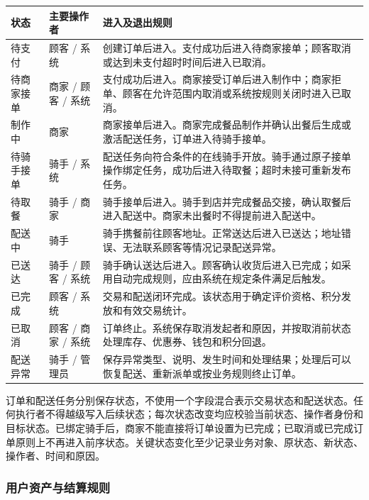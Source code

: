 \begin{longtable}{|>{\raggedright\arraybackslash}p{}|>{\raggedright\arraybackslash}p{}|>{\raggedright\arraybackslash}p{}|}
\hline
\textbf{状态} & \textbf{主要操作者} & \textbf{进入及退出规则} \\ \hline
待支付 & 顾客 / 系统 & 创建订单后进入。支付成功后进入待商家接单；顾客取消或达到未支付超时时间后进入已取消。 \\ \hline
待商家接单 & 商家 / 顾客 / 系统 & 支付成功后进入。商家接受订单后进入制作中；商家拒单、顾客在允许范围内取消或系统按规则关闭时进入已取消。 \\ \hline
制作中 & 商家 & 商家接单后进入。商家完成餐品制作并确认出餐后生成或激活配送任务，订单进入待骑手接单。 \\ \hline
待骑手接单 & 骑手 / 系统 & 配送任务向符合条件的在线骑手开放。骑手通过原子接单操作绑定任务，成功后进入待取餐；超时未接可重新发布任务。 \\ \hline
待取餐 & 骑手 / 商家 & 骑手接单后进入。骑手到店并完成餐品交接，确认取餐后进入配送中。商家未出餐时不得提前进入配送中。 \\ \hline
配送中 & 骑手 & 骑手携餐前往顾客地址。正常送达后进入已送达；地址错误、无法联系顾客等情况记录配送异常。 \\ \hline
已送达 & 骑手 / 顾客 / 系统 & 骑手确认送达后进入。顾客确认收货后进入已完成；如采用自动完成规则，应由系统在规定条件满足后触发。 \\ \hline
已完成 & 顾客 / 系统 & 交易和配送闭环完成。该状态用于确定评价资格、积分发放和有效交易统计。 \\ \hline
已取消 & 顾客 / 商家 / 系统 & 订单终止。系统保存取消发起者和原因，并按取消前状态处理库存、优惠券、钱包和积分回退。 \\ \hline
配送异常 & 骑手 / 管理员 & 保存异常类型、说明、发生时间和处理结果；处理后可以恢复配送、重新派单或按业务规则终止订单。 \\ \hline
\end{longtable}

订单和配送任务分别保存状态，不使用一个字段混合表示交易状态和配送状态。任何执行者不得越级写入后续状态；每次状态改变均应校验当前状态、操作者身份和目标状态。已绑定骑手后，商家不能直接将订单设置为已完成；已取消或已完成订单原则上不再进入前序状态。关键状态变化至少记录业务对象、原状态、新状态、操作者、时间和原因。

\subsubsection{用户资产与结算规则}

